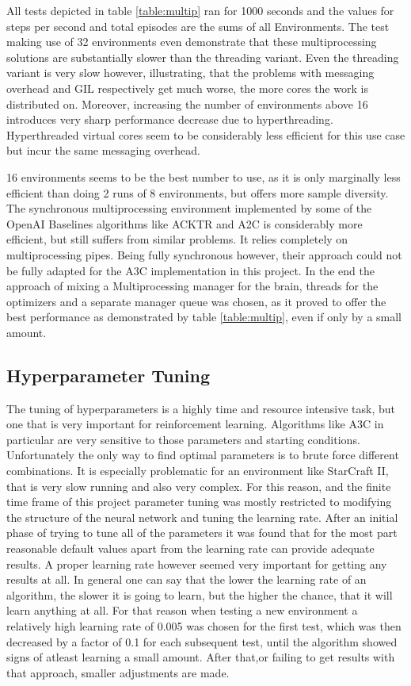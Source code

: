 All tests depicted in table \ref{table:multip} ran for 1000 seconds and the values for steps per second and total episodes are the sums of all Environments.
The test making use of 32 environments even demonstrate that these multiprocessing solutions are substantially slower than the threading variant. Even the threading variant is very slow however, illustrating, that the problems with messaging overhead and GIL respectively get much worse, the more cores the work is distributed on. Moreover, increasing the number of environments above 16 introduces very sharp performance decrease due to hyperthreading. Hyperthreaded virtual cores seem to be considerably less efficient for this use case but incur the same messaging overhead.

16 environments seems to be the best number to use, as it is only marginally less efficient than doing 2 runs of 8 environments, but offers more sample diversity.
The synchronous multiprocessing environment implemented by some of the OpenAI Baselines algorithms like ACKTR and A2C is considerably more efficient, but still suffers from similar problems. It relies completely on multiprocessing pipes. Being fully synchronous however, their approach could not be fully adapted for the A3C implementation in this project. In the end the approach of mixing a Multiprocessing manager for the brain, threads for the optimizers and a separate manager queue was chosen, as it proved to offer the best performance as demonstrated by table \ref{table:multip}, even if only by a small amount.

\subsection{Hyperparameter Tuning}
The tuning of hyperparameters is a highly time and resource intensive task, but one that is very important for reinforcement learning. Algorithms like A3C in particular are very sensitive to those parameters and starting conditions. Unfortunately the only way to find optimal parameters is to brute force different combinations.
It is especially problematic for an environment like StarCraft II, that is very slow running and also very complex. For this reason, and the finite time frame of this project parameter tuning was mostly restricted to modifying the structure of the neural network and tuning the learning rate. After an initial phase of trying to tune all of the parameters it was found that for the most part reasonable default values apart from the learning rate can provide adequate results. A proper learning rate however seemed very important for getting any results at all. In general one can say that the lower the learning rate of an algorithm, the slower it is going to learn, but the higher the chance, that it will learn anything at all. For that reason when testing a new environment a relatively high learning rate of 0.005 was chosen for the first test, which was then decreased by a factor of 0.1 for each subsequent test, until the algorithm showed signs of atleast learning a small amount. After that,or failing to get results with that approach, smaller adjustments are made.


